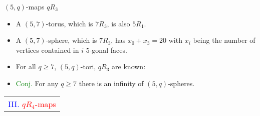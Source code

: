\documentclass[%
pdf,
colorBG,
slideColor,
]{prosper}
\begin{document}
\begin{slide}{$(5,q)$-maps $qR_3$}
\begin{itemize}
\item A $(5,7)$-torus, which is $7R_3$, is also $5R_1$.
\item A $(5,7)$-sphere, which is $7R_3$, has $x_0+x_3=20$ with $x_i$ being the number of vertices contained in $i$ $5$-gonal faces.
\item For all $q\geq 7$, $(5,q)$-tori, $qR_3$ are known:
\begin{center}
\begin{minipage}{3.5cm}
\centering
{}\par
\end{minipage}
\begin{minipage}{3.5cm}
\centering
{}\par
\end{minipage}
\begin{minipage}{3.5cm}
\centering
{}\par
\end{minipage}
\end{center}
\item \textcolor{green}{Conj.} For any $q\geq 7$ there is an infinity of $(5,q)$-spheres.
\end{itemize}

\end{slide}





\begin{slide}{}
\begin{center}
{\Huge 
\begin{tabular*}{7cm}{c}
\\[-0.5cm]
\textcolor{blue}{III. }\textcolor{red}{$qR_4$-maps}
\end{tabular*}
}
\end{center}
\end{slide}
\end{document}
